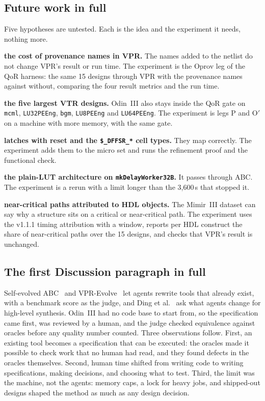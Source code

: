 \documentclass[conference]{IEEEtran}
\newcommand{\code}[1]{\texttt{#1}}
\begin{document}
\subsection{Future work in full}

Five hypotheses are untested. Each is the idea and the experiment it needs, nothing more.

\textbf{the cost of provenance names in VPR.} The names added to the netlist do not change VPR's result or run time. The experiment is the Oprov leg of the QoR harness: the same 15 designs through VPR with the provenance names against without, comparing the four result metrics and the run time.

\textbf{the five largest VTR designs.} Odin~III also stays inside the QoR gate on \code{mcml}, \code{LU32PEEng}, \code{bgm}, \code{LU8PEEng} and \code{LU64PEEng}. The experiment is legs P and O$'$ on a machine with more memory, with the same gate.

\textbf{latches with reset and the \code{\$\_DFFSR\_*} cell types.} They map correctly. The experiment adds them to the micro set and runs the refinement proof and the functional check.

\textbf{the plain-LUT architecture on \code{mkDelayWorker32B}.} It passes through ABC. The experiment is a rerun with a limit longer than the 3,600\,s that stopped it.

\textbf{near-critical paths attributed to HDL objects.} The Mimir~III dataset can say why a structure sits on a critical or near-critical path. The experiment uses the v1.1.1 timing attribution with a window, reports per HDL construct the share of near-critical paths over the 15 designs, and checks that VPR's result is unchanged.

\subsection{The first Discussion paragraph in full}

Self-evolved ABC~ and VPR-Evolve~ let agents rewrite tools that already exist, with a benchmark score as the judge, and Ding et al.~ ask what agents change for high-level synthesis. Odin~III had no code base to start from, so the specification came first, was reviewed by a human, and the judge checked equivalence against oracles before any quality number counted. Three observations follow. First, an existing tool becomes a specification that can be executed: the oracles made it possible to check work that no human had read, and they found defects in the oracles themselves. Second, human time shifted from writing code to writing specifications, making decisions, and choosing what to test. Third, the limit was the machine, not the agents: memory caps, a lock for heavy jobs, and shipped-out designs shaped the method as much as any design decision.
\end{document}
